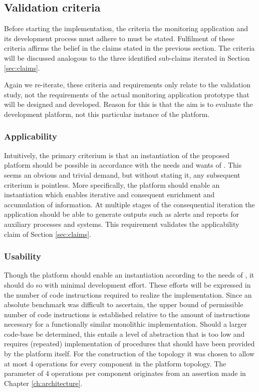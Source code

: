 \subsection{Validation criteria}
\label{sec:criteria}
Before starting the implementation, the criteria the monitoring application and its development process must adhere to must be stated. Fulfilment of these criteria affirms the belief in the claims stated in the previous section. The criteria will be discussed analogous to the three identified sub-claims iterated in Section \ref{sec:claims}.

Again we re-iterate, these criteria and requirements only relate to the validation study, not the requirements of the actual monitoring application prototype that will be designed and developed. Reason for this is that the aim is to evaluate the development platform, not this particular instance of the platform.

\subsubsection*{Applicability}
Intuitively, the primary criterium is that an instantiation of the proposed platform should be possible in accordance with the needs and wants of \idsystems . This seems an obvious and trivial demand, but without stating it, any subsequent criterium is pointless. More specifically, the platform should enable an instantiation which enables iterative and consequent enrichment and accumulation of information. At multiple stages of the consequential iteration the application should be able to generate outputs such as alerts and reports for auxiliary processes and systems. This requirement validates the applicability claim of Section \ref{sec:claims}.

\subsubsection*{Usability} 
Though the platform should enable an instantiation according to the needs of \idsystems, it should do so with minimal development effort. These efforts will be expressed in the number of code instructions required to realize the implementation. Since an absolute benchmark was difficult to ascertain, the upper bound of permissible number of code instructions is established relative to the amount of instructions necessary for a functionally similar monolithic implementation. Should a larger code-base be determined, this entails a level of abstraction that is too low and requires (repeated) implementation of procedures that should have been provided by the platform itself. For the construction of the topology it was chosen to allow at most 4 operations for every component in the platform topology. The parameter of 4 operations per component originates from an assertion made in Chapter \ref{ch:architecture}.

